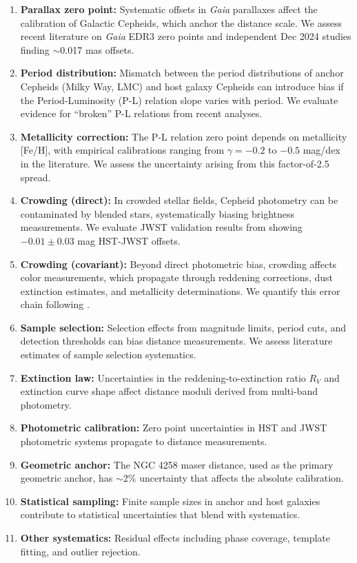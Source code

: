 \documentclass[twocolumn, linenumbers]{aastex701}
\begin{document}
\begin{enumerate}
\item \textbf{Parallax zero point:} Systematic offsets in \textit{Gaia} parallaxes affect the calibration of Galactic Cepheids, which anchor the distance scale. We assess recent literature on \textit{Gaia} EDR3 zero points \citep{Lindegren2021} and independent Dec 2024 studies finding $\sim$0.017 mas offsets.

\item \textbf{Period distribution:} Mismatch between the period distributions of anchor Cepheids (Milky Way, LMC) and host galaxy Cepheids can introduce bias if the Period-Luminosity (P-L) relation slope varies with period. We evaluate evidence for ``broken'' P-L relations from recent analyses.

\item \textbf{Metallicity correction:} The P-L relation zero point depends on metallicity [Fe/H], with empirical calibrations ranging from $\gamma = -0.2$ to $-0.5$ mag/dex in the literature. We assess the uncertainty arising from this factor-of-2.5 spread.

\item \textbf{Crowding (direct):} In crowded stellar fields, Cepheid photometry can be contaminated by blended stars, systematically biasing brightness measurements. We evaluate JWST validation results from \citet{Riess2024JWST} showing $-0.01 \pm 0.03$ mag HST-JWST offsets.

\item \textbf{Crowding (covariant):} Beyond direct photometric bias, crowding affects color measurements, which propagate through reddening corrections, dust extinction estimates, and metallicity determinations. We quantify this error chain following \citet{Freedman2024}.

\item \textbf{Sample selection:} Selection effects from magnitude limits, period cuts, and detection thresholds can bias distance measurements. We assess literature estimates of sample selection systematics.

\item \textbf{Extinction law:} Uncertainties in the reddening-to-extinction ratio $R_V$ and extinction curve shape affect distance moduli derived from multi-band photometry.

\item \textbf{Photometric calibration:} Zero point uncertainties in HST and JWST photometric systems propagate to distance measurements.

\item \textbf{Geometric anchor:} The NGC 4258 maser distance, used as the primary geometric anchor, has $\sim$2\% uncertainty that affects the absolute calibration.

\item \textbf{Statistical sampling:} Finite sample sizes in anchor and host galaxies contribute to statistical uncertainties that blend with systematics.

\item \textbf{Other systematics:} Residual effects including phase coverage, template fitting, and outlier rejection.
\end{enumerate}
\end{document}
